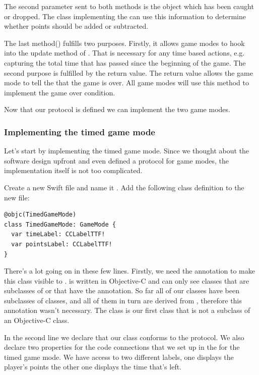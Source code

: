 The second parameter sent to both methods is the object which has been caught or dropped. The class implementing
the  can use this information to determine whether
points should be added or subtracted.

The last method() fulfills two purposes. Firstly, it
allows game modes to hook into the update method of . That
is necessary for any time based actions, e.g. capturing the total time that
has passed since the beginning of the game. The second purpose is fulfilled by
the  return value. The return value allows the game mode to
tell the  that the game is over. All game modes will use
this method to implement the game over condition.

Now that our protocol is defined we can implement the two game modes. 

\subsubsection{Implementing the timed game mode}
Let's start by implementing the timed game mode. Since we thought about the
software design upfront and even defined a protocol for game modes, the
implementation itself is not too complicated.

\begin{leftbar}
Create a new Swift file and name it . Add the
following class definition to the new file:
\begin{lstlisting}
@objc(TimedGameMode)
class TimedGameMode: GameMode {
  var timeLabel: CCLabelTTF!
  var pointsLabel: CCLabelTTF!
}
\end{lstlisting}
\end{leftbar}
There's a lot going on in these few lines. Firstly, we need the
 annotation to make this class visible to \cocos{}. \cocos{}
is written in Objective-C and can only see classes that are subclasses of
 or that have the  annotation. So far all
of our classes have been subclasses of \cocos{} classes, and all of them in turn
are derived from , therefore this annotation wasn't
necessary. The  class is our first class that is not a
subclass of an Objective-C class.

In the second line we declare that our class conforms to the
 protocol. We also declare two properties
for the code connections that we set up in the \ccbfile{} for the timed game
mode. We have access to two different labels, one displays the player's
points the other one displays the time that's left.

